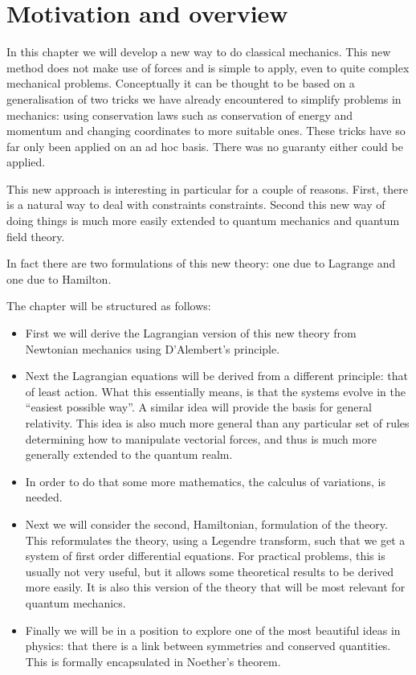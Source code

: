 \chapter{Motivation and overview}
In this chapter we will develop a new way to do classical mechanics. This new method does not make use of forces and is simple to apply, even to quite complex mechanical problems. Conceptually it can be thought to be based on a generalisation of two tricks we have already encountered to simplify problems in mechanics: using conservation laws such as conservation of energy and momentum and changing coordinates to more suitable ones. These tricks have so far only been applied on an ad hoc basis. There was no guaranty either could be applied.

This new approach is interesting in particular for a couple of reasons. First, there is a natural way to deal with constraints constraints. Second this new way of doing things is much more easily extended to quantum mechanics and quantum field theory.

In fact there are two formulations of this new theory: one due to Lagrange and one due to Hamilton.

The chapter will be structured as follows:
\begin{itemize}
\item First we will derive the Lagrangian version of this new theory from Newtonian mechanics using D'Alembert's principle.
\item Next the Lagrangian equations will be derived from a different principle: that of least action. What this essentially means, is that the systems evolve in the ``easiest possible way''. A similar idea will provide the basis for general relativity. This idea is also much more general than any particular set of rules determining how to manipulate vectorial forces, and thus is much more generally extended to the quantum realm.
\item In order to do that some more mathematics, the calculus of variations, is needed.

\item Next we will consider the second, Hamiltonian, formulation of the theory. This reformulates the theory, using a Legendre transform, such that we get a system of first order differential equations. For practical problems, this is usually not very useful, but it allows some theoretical results to be derived more easily. It is also this version of the theory that will be most relevant for quantum mechanics.
\item Finally we will be in a position to explore one of the most beautiful ideas in physics: that there is a link between symmetries and conserved quantities. This is formally encapsulated in Noether's theorem.
\end{itemize} 

